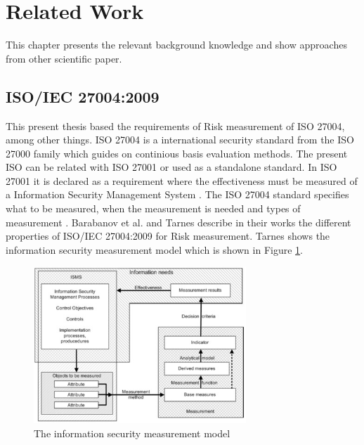 
\section{Related Work}
\label{sec:relWork}

This chapter presents the relevant background knowledge and show approaches from other scientific paper.

\subsection{ISO/IEC 27004:2009}

This present thesis based the requirements of Risk measurement of ISO 27004, among other things. ISO 27004 is a international security standard from the ISO 27000 \cite{DBLP:conf/euspn/MeriahR19} family which guides on continious basis evaluation methods. The present ISO can be related with ISO 27001 or used as a standalone standard. In ISO 27001 it is declared as a requirement where the effectiveness must be measured of a Information Security Management System \cite{barabanov2011information}. The ISO 27004 standard specifies what to be measured, when the measurement is needed and types of measurement \cite{lundholm2011design}. Barabanov et al. \cite{barabanov2011information} and Tarnes \cite{tarnes2012information} describe in their works the different properties of ISO/IEC 27004:2009 for Risk measurement. Tarnes shows the information security measurement model which is shown in Figure \ref{fig:is_measurement_model}.

\begin{figure}[h!]
  \centering
  \includegraphics[width=8cm]{pictures/is_measurement_model.jpg}
  \caption{The information security measurement model \cite{tarnes2012information}}
  \label{fig:is_measurement_model}
\end{figure}

